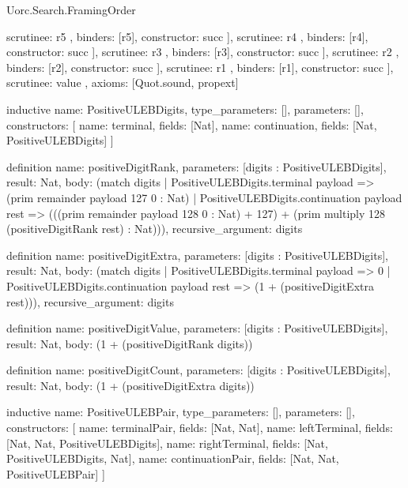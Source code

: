 \begin{lexlean}{Uorc.Search.FramingOrder}
\begin{semanticmodule}
{{{{{{{{{{{{                                  scrutinee: r5
                                },
                                binders: [r5],
                                constructor: succ
                              }
                            ],
                            scrutinee: r4
                          },
                          binders: [r4],
                          constructor: succ
                        }
                      ],
                      scrutinee: r3
                    },
                    binders: [r3],
                    constructor: succ
                  }
                ],
                scrutinee: r2
              },
              binders: [r2],
              constructor: succ
            }
          ],
          scrutinee: r1
        },
        binders: [r1],
        constructor: succ
      }
    ],
    scrutinee: value
  },
  axioms: [Quot.sound, propext]
}

inductive{
  name: PositiveULEBDigits,
  type_parameters: [],
  parameters: [],
  constructors: [
    {name: terminal, fields: [Nat]},
    {name: continuation, fields: [Nat, PositiveULEBDigits]}
  ]
}

definition{
  name: positiveDigitRank,
  parameters: [digits : PositiveULEBDigits],
  result: Nat,
  body: (match digits
    | PositiveULEBDigits.terminal payload => (prim remainder payload 127 0 : Nat)
    | PositiveULEBDigits.continuation payload rest => (((prim remainder payload 128 0 : Nat) + 127) + (prim multiply 128 (positiveDigitRank rest) : Nat))),
  recursive_argument: digits
}

definition{
  name: positiveDigitExtra,
  parameters: [digits : PositiveULEBDigits],
  result: Nat,
  body: (match digits
    | PositiveULEBDigits.terminal payload => 0
    | PositiveULEBDigits.continuation payload rest => (1 + (positiveDigitExtra rest))),
  recursive_argument: digits
}

definition{
  name: positiveDigitValue,
  parameters: [digits : PositiveULEBDigits],
  result: Nat,
  body: (1 + (positiveDigitRank digits))
}

definition{
  name: positiveDigitCount,
  parameters: [digits : PositiveULEBDigits],
  result: Nat,
  body: (1 + (positiveDigitExtra digits))
}

inductive{
  name: PositiveULEBPair,
  type_parameters: [],
  parameters: [],
  constructors: [
    {name: terminalPair, fields: [Nat, Nat]},
    {name: leftTerminal, fields: [Nat, Nat, PositiveULEBDigits]},
    {name: rightTerminal, fields: [Nat, PositiveULEBDigits, Nat]},
    {name: continuationPair, fields: [Nat, Nat, PositiveULEBPair]}
  ]
}


\end{semanticmodule}
\end{lexlean}
